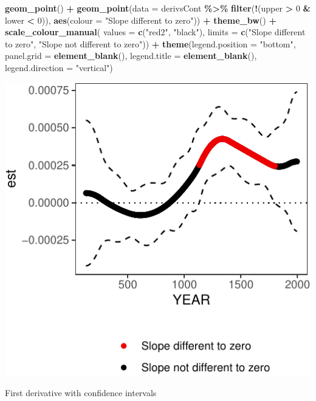 \documentclass[nofonts,]{tufte-handout}
\newenvironment{Shaded}{\begin{snugshade}}{\end{snugshade}}
\newcommand{\AttributeTok}[1]{\textcolor[rgb]{0.13,0.29,0.53}{#1}}
\newcommand{\DecValTok}[1]{\textcolor[rgb]{0.00,0.00,0.81}{#1}}
\newcommand{\FunctionTok}[1]{\textcolor[rgb]{0.13,0.29,0.53}{\textbf{#1}}}
\newcommand{\NormalTok}[1]{#1}
\newcommand{\SpecialCharTok}[1]{\textcolor[rgb]{0.81,0.36,0.00}{\textbf{#1}}}
\newcommand{\StringTok}[1]{\textcolor[rgb]{0.31,0.60,0.02}{#1}}
\begin{document}
\begin{Shaded}
\begin{Highlighting}[]
   \FunctionTok{geom\_point}\NormalTok{() }\SpecialCharTok{+}
   \FunctionTok{geom\_point}\NormalTok{(}\AttributeTok{data =}\NormalTok{ derivsCont  }\SpecialCharTok{\%\textgreater{}\%} 
                \FunctionTok{filter}\NormalTok{(}\SpecialCharTok{!}\NormalTok{(upper }\SpecialCharTok{\textgreater{}} \DecValTok{0} \SpecialCharTok{\&}\NormalTok{ lower }\SpecialCharTok{\textless{}} \DecValTok{0}\NormalTok{)),}
              \FunctionTok{aes}\NormalTok{(}\AttributeTok{colour =} \StringTok{"Slope different to zero"}\NormalTok{)) }\SpecialCharTok{+}
   \FunctionTok{theme\_bw}\NormalTok{() }\SpecialCharTok{+}
   \FunctionTok{scale\_colour\_manual}\NormalTok{(}
     \AttributeTok{values =} \FunctionTok{c}\NormalTok{(}\StringTok{"red2"}\NormalTok{, }\StringTok{"black"}\NormalTok{),}
     \AttributeTok{limits =} \FunctionTok{c}\NormalTok{(}\StringTok{"Slope different to zero"}\NormalTok{,}
                \StringTok{"Slope not different to zero"}\NormalTok{)) }\SpecialCharTok{+}
   \FunctionTok{theme}\NormalTok{(}\AttributeTok{legend.position =} \StringTok{"bottom"}\NormalTok{,}
         \AttributeTok{panel.grid =} \FunctionTok{element\_blank}\NormalTok{(),}
         \AttributeTok{legend.title =} \FunctionTok{element\_blank}\NormalTok{(),}
         \AttributeTok{legend.direction =} \StringTok{"vertical"}\NormalTok{)}
\end{Highlighting}
\end{Shaded}

\begin{marginfigure}
\includegraphics{Technical-supplement_files/figure-latex/calcDerivStart-1} \caption[First derivative with confidence intervals]{First derivative with confidence intervals}\label{fig:calcDerivStart}
\end{marginfigure}
\end{document}
